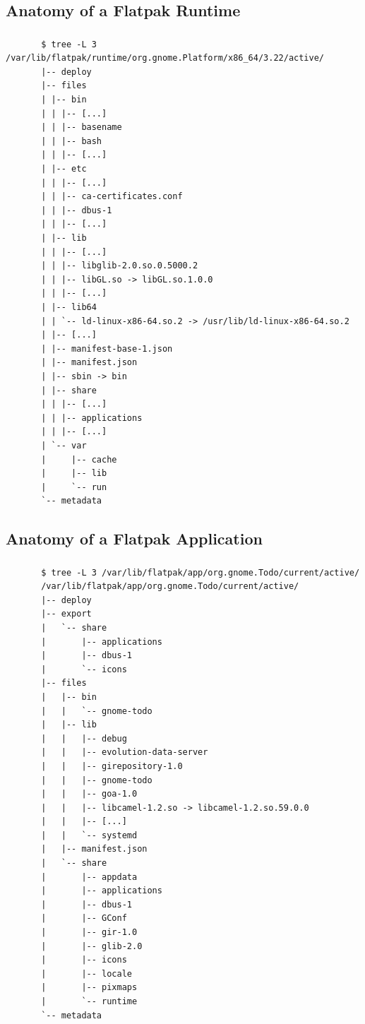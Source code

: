 \subsection{Anatomy of a Flatpak Runtime}
\begin{frame}[fragile]
  \frametitle{\insertsubsection}

    \begin{tiny}
\begin{verbatim}
       $ tree -L 3 /var/lib/flatpak/runtime/org.gnome.Platform/x86_64/3.22/active/
       |-- deploy
       |-- files
       | |-- bin
       | | |-- [...]
       | | |-- basename
       | | |-- bash
       | | |-- [...]
       | |-- etc
       | | |-- [...]
       | | |-- ca-certificates.conf
       | | |-- dbus-1
       | | |-- [...]
       | |-- lib
       | | |-- [...]
       | | |-- libglib-2.0.so.0.5000.2
       | | |-- libGL.so -> libGL.so.1.0.0
       | | |-- [...]
       | |-- lib64
       | | `-- ld-linux-x86-64.so.2 -> /usr/lib/ld-linux-x86-64.so.2
       | |-- [...]
       | |-- manifest-base-1.json
       | |-- manifest.json
       | |-- sbin -> bin
       | |-- share
       | | |-- [...]
       | | |-- applications
       | | |-- [...]
       | `-- var
       |     |-- cache
       |     |-- lib
       |     `-- run
       `-- metadata
\end{verbatim}
    \end{tiny}
\end{frame}

\subsection{Anatomy of a Flatpak Application}
\begin{frame}[fragile]
  \frametitle{\insertsubsection}

    \begin{tiny}
\begin{verbatim}
       $ tree -L 3 /var/lib/flatpak/app/org.gnome.Todo/current/active/
       /var/lib/flatpak/app/org.gnome.Todo/current/active/
       |-- deploy
       |-- export
       |   `-- share
       |       |-- applications
       |       |-- dbus-1
       |       `-- icons
       |-- files
       |   |-- bin
       |   |   `-- gnome-todo
       |   |-- lib
       |   |   |-- debug
       |   |   |-- evolution-data-server
       |   |   |-- girepository-1.0
       |   |   |-- gnome-todo
       |   |   |-- goa-1.0
       |   |   |-- libcamel-1.2.so -> libcamel-1.2.so.59.0.0
       |   |   |-- [...]
       |   |   `-- systemd
       |   |-- manifest.json
       |   `-- share
       |       |-- appdata
       |       |-- applications
       |       |-- dbus-1
       |       |-- GConf
       |       |-- gir-1.0
       |       |-- glib-2.0
       |       |-- icons
       |       |-- locale
       |       |-- pixmaps
       |       `-- runtime
       `-- metadata
\end{verbatim}
    \end{tiny}
\end{frame}

